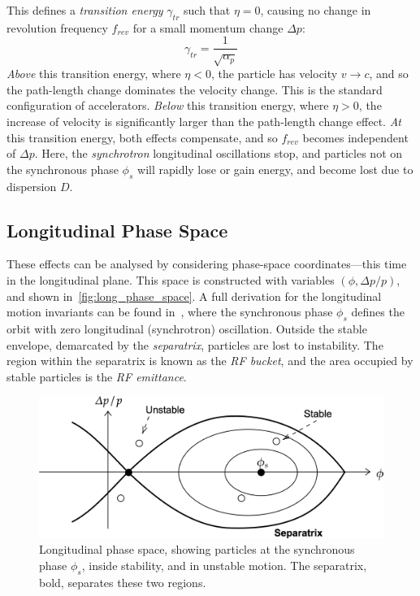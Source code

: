 \documentclass[a4paper,twoside,11pt]{report}
\begin{document}
This defines a \textit{transition energy} $\gamma_{tr}$ such that $\eta=0$, causing no change in revolution frequency $f_{rev}$ for a small momentum change $\Delta p$:
\begin{equation}
  \gamma_{tr}=\frac 1{\sqrt{\alpha_p}}
\end{equation}
\textit{Above} this transition energy, where $\eta<0$, the particle has velocity $v\rightarrow c$, and so the path-length change dominates the velocity change. This is the standard configuration of accelerators.
\textit{Below} this transition energy, where $\eta >0$, the increase of velocity is significantly larger than the path-length change effect.
\textit{At} this transition energy, both effects compensate, and so $f_{rev}$ becomes independent of $\Delta p$. Here, the \textit{synchrotron} longitudinal oscillations stop, and particles not on the synchronous phase $\phi_s$ will rapidly lose or gain energy, and become lost due to dispersion $D$.


\subsection{Longitudinal Phase Space}\label{sec:long_phase_space}

These effects can be analysed by considering phase-space coordinates---this time in the longitudinal plane. This space is constructed with variables $(\phi , \Delta p/p)$, and shown in~\autoref{fig:long_phase_space}. A full derivation for the longitudinal motion invariants can be found in~\cite{lbd:tecker}, where the synchronous phase $\phi_s$ defines the orbit with zero longitudinal (synchrotron) oscillation. Outside the stable envelope, demarcated by the \textit{separatrix}, particles are lost to instability. The region within the separatrix is known as the \textit{RF bucket}, and the area occupied by stable particles is the \textit{RF emittance}.

\begin{figure}[h]
  \centering
  \includegraphics*[width=0.9\linewidth]{long-phase-space.png}
  \caption[Longitudinal phase space and particle stability]{Longitudinal phase space, showing particles at the synchronous phase $\phi_s$, inside stability, and in unstable motion. The separatrix, bold, separates these two regions.}\label{fig:long_phase_space}
\end{figure}
\end{document}
